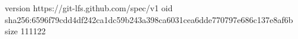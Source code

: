 version https://git-lfs.github.com/spec/v1
oid sha256:6596f79cdd4df242ca1dc59b243a398ca6031cea6dde770797e686c137e8af6b
size 111122
